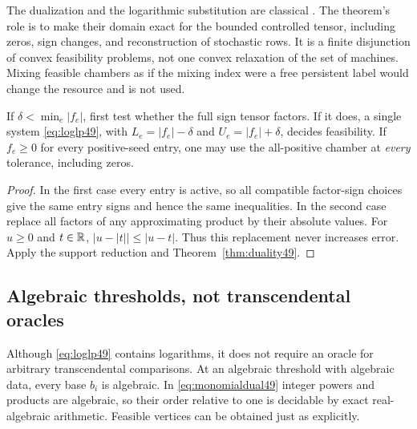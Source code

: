 The dualization and the logarithmic substitution are classical
\cite[\S5.8]{BV04}\cite[\S2 and \S8]{BKVH07}.
The theorem's role is to make their domain exact for the bounded
controlled tensor, including zeros, sign changes, and reconstruction
of stochastic rows. It is a finite disjunction of convex feasibility
problems, not one convex relaxation of the set of machines. Mixing
feasible chambers as if the mixing index were a free persistent label
would change the resource and is not used.

\begin{corollary}\label{cor:onechamber49}
If $\delta<\min_e|f_e|$, first test whether the full sign tensor factors.
If it does, a single system \eqref{eq:loglp49}, with
$L_e=|f_e|-\delta$ and $U_e=|f_e|+\delta$, decides feasibility.
If $f_e\ge0$ for every positive-seed entry, one may use the all-positive
chamber at \emph{every} tolerance, including zeros.
\end{corollary}
\begin{proof}
In the first case every entry is active, so all compatible factor-sign
choices give the same entry signs and hence the same inequalities.
In the second case replace all factors of any approximating product
by their absolute values. For $u\ge0$ and $t\in\mathbb R$,
$|u-|t||\le|u-t|$. Thus this replacement never increases error.
Apply the support reduction and Theorem~\ref{thm:duality49}.
\end{proof}

\subsection{Algebraic thresholds, not transcendental oracles}
Although \eqref{eq:loglp49} contains logarithms, it does not require
an oracle for arbitrary transcendental comparisons. At an algebraic
threshold with algebraic data, every base $b_i$ is algebraic. In
\eqref{eq:monomialdual49} integer powers and products are algebraic,
so their order relative to one is decidable by exact real-algebraic
arithmetic. Feasible vertices can be obtained just as explicitly.

